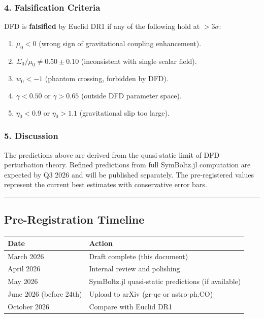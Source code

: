 \documentclass[11pt,a4paper]{article}
\begin{document}
\subsubsection*{4. Falsification Criteria}

DFD is \textbf{falsified} by Euclid DR1 if any of the following hold at $> 3\sigma$:
\begin{enumerate}
\item $\mu_0 < 0$ (wrong sign of gravitational coupling enhancement).
\item $\Sigma_0 / \mu_0 \neq 0.50 \pm 0.10$ (inconsistent with single scalar field).
\item $w_0 < -1$ (phantom crossing, forbidden by DFD).
\item $\gamma < 0.50$ or $\gamma > 0.65$ (outside DFD parameter space).
\item $\eta_0 < 0.9$ or $\eta_0 > 1.1$ (gravitational slip too large).
\end{enumerate}

\subsubsection*{5. Discussion}

The predictions above are derived from the quasi-static limit of DFD perturbation theory. Refined predictions from full SymBoltz.jl computation are expected by Q3 2026 and will be published separately. The pre-registered values represent the current best estimates with conservative error bars.

\noindent\rule{\textwidth}{0.5pt}

\subsection{Pre-Registration Timeline}

\begin{center}
\begin{tabular}{ll}
\toprule
\textbf{Date} & \textbf{Action} \\
\midrule
March 2026 & Draft complete (this document) \\
April 2026 & Internal review and polishing \\
May 2026 & SymBoltz.jl quasi-static predictions (if available) \\
June 2026 (before 24th) & Upload to arXiv (gr-qc or astro-ph.CO) \\
October 2026 & Compare with Euclid DR1 \\
\bottomrule
\end{tabular}
\end{center}
\end{document}
